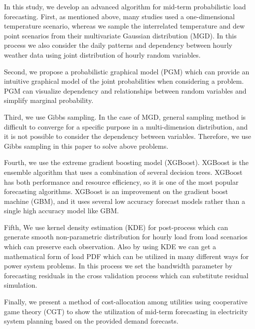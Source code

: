 \documentclass[journal]{IEEEtran} %
\begin{document}

In this study, we develop an advanced algorithm for mid-term probabilistic load forecasting. First, as mentioned above, many studies used a one-dimensional temperature scenario, whereas we sample the interrelated temperature and dew point  scenarios from their multivariate Gaussian distribution (MGD). In this process we also consider the daily patterns and dependency between hourly weather data using joint distribution of hourly random variables. %

Second, we propose a probabilistic graphical model (PGM) which can provide an intuitive graphical model of the joint probabilities when considering a problem. PGM can visualize dependency and relationships between random variables and simplify marginal probability.

Third, we use Gibbs sampling. In the case of MGD, general sampling method is difficult to converge for a specific purpose in a multi-dimension distribution, and it is not possible to consider the dependency between variables. Therefore, we use Gibbs sampling in this paper to solve above problems.

Fourth, we use the extreme gradient boosting model (XGBoost). XGBoost is the ensemble algorithm that uses a combination of several decision trees. XGBoost has both performance and resource efficiency, so it is one of the most popular forecasting algorithms. XGBoost is an improvement on the gradient boost machine (GBM), and it uses several low accuracy forecast models rather than a single high accuracy model like GBM.   

Fifth, We use kernel density estimation (KDE) for post-process which can generate smooth non-parametric distribution for hourly load from load scenarios which can preserve each observation. Also by using KDE we can get a mathematical form of load PDF which can be utilized in many different ways for power system problems. In this process we set the bandwidth parameter by forecasting residuals in the cross validation process which can substitute residual simulation.

Finally, we present a method of cost-allocation among utilities using cooperative game theory (CGT) to show the utilization of mid-term forecasting in electricity system planning based on the provided demand forecasts.
 
\end{document}
